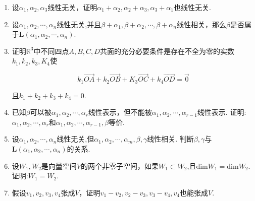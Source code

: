 \documentclass{ctexart}
\begin{document}
\begin{enumerate}
    \vspace*{80pt}
    
    \item 设$\alpha_1,\alpha_2,\alpha_3$线性无关，证明$\alpha_1+\alpha_2,\alpha_2+\alpha_3,\alpha_3+\alpha_1$也线性无关.\\
    
    \vspace*{80pt}
    
    \item 设$\alpha_1,\alpha_2,\cdots,\alpha_n$线性无关,并且$\beta+\alpha_1,\beta+\alpha_2,\cdots,\beta+\alpha_n$线性相关，那么$\beta$是否属于$\mathbf{L}(\alpha_1,\alpha_2,\cdots,\alpha_n)$.\\
    
    \vspace*{80pt}
    
    \item 证明$\mathbb{R}^3$中不同四点$A,B,C,D$共面的充分必要条件是存在不全为零的实数$k_1,k_2,k_3,K_4$使
    
    $$
    k_1\vec{OA}+k_2\vec{OB}+K_3\vec{OC}+k_4\vec{OD}=\vec{0}
    $$
    
    且$k_1+k_2+k_3+k_4=0$.\\

    \newpage

    \item 已知$\beta$可以被$\alpha_1,\alpha_2,\cdots,\alpha_r$线性表示，但不能被$\alpha_1,\alpha_2,\cdots,\alpha_{r-1}$线性表示.
    证明:$\alpha_1,\alpha_2,\cdots,\alpha_r$和$\alpha_1,\alpha_2,\cdots,\alpha_{r-1},\beta$等价.\\

    \vspace*{80pt}

    \item 设$\alpha_1,\alpha_2,\cdots,\alpha_n$线性无关,但$\alpha_1,\alpha_2,\cdots,\alpha_m,\beta,\gamma$线性相关. 判断$\beta,\gamma$与$\mathbf{L}(\alpha_1,\alpha_2,\cdots,\alpha_n)$的关系.\\
    
    \vspace*{80pt}
    
    \item 设$W_1,W_2$是向量空间$V$的两个非零子空间，如果$W_1\subset W_2$,且$\mbox{dim}W_1=\mbox{dim}W_2$. 证明:$W_1=W_2$.\\
    
    \vspace*{80pt}
    
    \item 假设$v_1,v_2,v_3,v_4$张成$V$，证明$v_1-v_2,v_2-v_3,v_3-v_4,v_4$也能张成$V$.\\
    

\end{enumerate}
\end{document}
